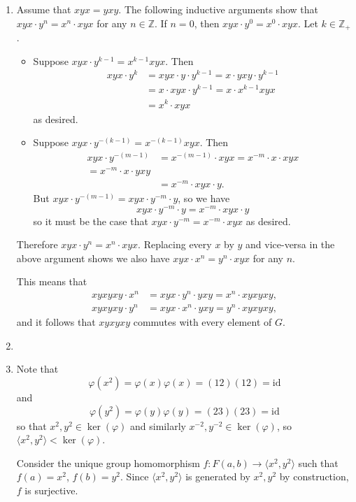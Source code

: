 \documentclass{article}
\begin{document}
\begin{Answer}
\begin{enumerate}
  \item{
    Assume that $xyx = yxy$. The following inductive arguments show
    that $xyx \cdot y^n = x^n \cdot xyx$ for any $n \in \mathbb{Z}$.
    If $n = 0$, then $xyx \cdot y^0 = x^0 \cdot xyx$. Let $k \in \mathbb{Z}_+$.
    \begin{itemize}
      \item{
        Suppose $xyx \cdot y^{k-1} = x^{k-1} xyx$. Then
        \begin{align*}
             xyx \cdot y^k
          &= xyx \cdot y \cdot y^{k-1}
           = x \cdot yxy \cdot y^{k-1} \\
          &= x \cdot xyx \cdot y^{k-1}
           = x \cdot x^{k-1} xyx       \\
          &= x^k \cdot xyx
        \end{align*}
        as desired.
      }
      \item{
        Suppose $xyx \cdot y^{-(k-1)} = x^{-(k-1)} xyx$.
        Then
        \begin{align*}
             xyx \cdot y^{-(m-1)}
          &= x^{-(m-1)} \cdot xyx
           = x^{-m} \cdot x \cdot xyx \\
           = x^{-m} \cdot x \cdot yxy \\
          &= x^{-m} \cdot xyx \cdot y.
        \end{align*}
        But $xyx \cdot y^{-(m-1)} = xyx \cdot y^{-m} \cdot y$, so we
        have
        $$
        xyx \cdot y^{-m} \cdot y = x^{-m} \cdot xyx \cdot y
        $$
        so it must be the case that $xyx \cdot y^{-m} = x^{-m} \cdot
        xyx$ as desired.
      }
    \end{itemize}
    Therefore $xyx \cdot y^n = x^n \cdot xyx$. Replacing every $x$ by
    $y$ and vice-versa in the above argument shows we also have
    $xyx \cdot x^n = y^n \cdot xyx$ for any $n$.

    This means that
    \begin{align*}
        xyxyxy \cdot x^n
     &= xyx \cdot y^n \cdot yxy
      = x^n \cdot xyxyxy, \\
        xyxyxy \cdot y^n
     &= xyx \cdot x^n \cdot yxy
      = y^n \cdot xyxyxy,
    \end{align*}
    and it follows that $xyxyxy$ commutes with every element of $G$.
  }
  \item{
  }
  \item{
    Note that
    $$
    \varphi(x^2) = \varphi(x)\varphi(x) = (12)(12) = \mathrm{id}
    $$
    and
    $$
    \varphi(y^2) = \varphi(y)\varphi(y) = (23)(23) = \mathrm{id}
    $$
    so that $x^2, y^2 \in \ker(\varphi)$ and similarly
    $x^{-2}, y^{-2} \in \ker(\varphi)$, so
    $\langle x^2, y^2 \rangle < \ker(\varphi)$.

    Consider the unique group homomorphism
    $f : F(a,b) \to \langle x^2, y^2 \rangle$ such that
    $f(a) = x^2$, $f(b) = y^2$. Since $\langle x^2, y^2 \rangle$ is
    generated by $x^2, y^2$ by construction, $f$ is surjective.
  }
\end{enumerate}
\end{Answer}

\pagebreak
\end{document}

